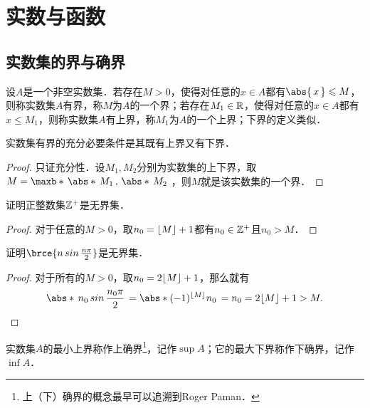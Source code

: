 \chapter{实数与函数}

\section{实数集的界与确界}

\begin{definition}
  \label{defn:bnd}
  设\(A\)是一个非空实数集．若存在\(M > 0\)，使得对任意的\(x \in A\)都有\(\abs{\,x\,} \le M\)，则称实数集\(A\)有界，称\(M\)为\(A\)的一个界；若存在\(M_1 \in \mathbb{R}\)，使得对任意的\(x \in A\)都有\(x \le M_1\)，则称实数集\(A\)有上界，称\(M_1\)为\(A\)的一个上界；下界的定义类似．
\end{definition}

\begin{theorem*}
  实数集有界的充分必要条件是其既有上界又有下界．

  \begin{proof}
    只证充分性．设\(M_1, M_2\)分别为实数集的上下界，取\(M = \maxb*{\,\abs*{\,M_1\,},\, \abs*{\,M_2\,}\,}\)，则\(M\)就是该实数集的一个界．
  \end{proof}
\end{theorem*}

\begin{example*}
  证明正整数集\(\mathbb{Z}^+\)是无界集．

  \begin{proof}
    对于任意的\(M > 0\)，取\(n_0 = \lfloor M\rfloor + 1\)都有\(n_0 \in \mathbb{Z}^+\)且\(n_0 > M\)．
  \end{proof}
\end{example*}


\begin{example*}
  证明\(\brce{n \sin \frac{n\pi}2}\)是无界集．

  \begin{proof}
    对于所有的\(M > 0\)，取\(n_0 = 2 \lfloor M\rfloor + 1\)，那么就有
    \[
      \abs*{\,n_0 \sin \frac{n_0\pi}2\,} = \abs*{(-1)^{\floor M} n_0\,} = n_0 = 2 \floor M + 1 > M. \qedhere
    \]
  \end{proof}
\end{example*}

\begin{definition*}
  实数集\(A\)的最小上界称作上确界\footnote{上（下）确界的概念最早可以追溯到Roger Paman\cite{PamanBio}．}，记作\(\sup A\)；它的最大下界称作下确界，记作\(\inf A\)．
\end{definition*}

